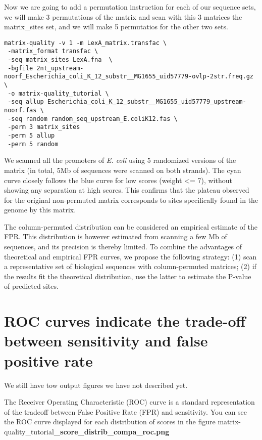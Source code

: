 Now we are going to add a permutation instruction for each of our
sequence sets, we will make 3 permutations of the matrix and scan with
this 3 matrices the matrix\_sites set, and we will make 5 permutatios
for the other two sets.

{\color{Blue} \begin{footnotesize}
\begin{verbatim}
matrix-quality -v 1 -m LexA_matrix.transfac \
 -matrix_format transfac \
 -seq matrix_sites LexA.fna  \
 -bgfile 2nt_upstream-noorf_Escherichia_coli_K_12_substr__MG1655_uid57779-ovlp-2str.freq.gz \
 -o matrix-quality_tutorial \
 -seq allup Escherichia_coli_K_12_substr__MG1655_uid57779_upstream-noorf.fas \
 -seq random random_seq_upstream_E.coliK12.fas \
 -perm 3 matrix_sites
 -perm 5 allup
 -perm 5 random
\end{verbatim} \end{footnotesize} }

We scanned all the promoters of \textit{E. coli} using 5 randomized
versions of the matrix (in total, 5Mb of sequences were scanned on
both strands). The cyan curve closely follows the blue curve for low
scores (weight <= 7), without showing any separation at high
scores. This confirms that the plateau observed for the original
non-permuted matrix corresponds to sites specifically found in the
genome by this matrix.

The column-permuted distribution can be considered an empirical
estimate of the FPR. This distribution is however estimated from
scanning a few Mb of sequences, and its precision is thereby
limited. To combine the advantages of theoretical and empirical FPR
curves, we propose the following strategy: (1) scan a representative
set of biological sequences with column-permuted matrices; (2) if the
results fit the theoretical distribution, use the latter to estimate
the P-value of predicted sites.

\section{ROC curves indicate the trade-off between sensitivity and false positive rate}

We still have tow output figures we have not described yet.

The Receiver Operating Characteristic (ROC) curve is a standard
representation of the tradeoff between False Positive Rate (FPR) and
sensitivity.  You can see the ROC curve displayed for each
distribution of scores in the figure
matrix-quality\_tutorial\textbf{\_score\_distrib\_compa\_roc.png}

